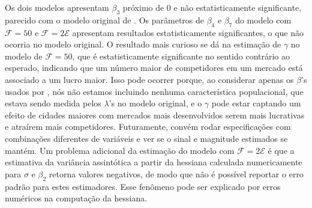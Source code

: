 \documentclass{article}
\begin{document}
Os dois modelos apresentam $\beta_3$ próximo de 0 e não estatisticamente significante, parecido com o modelo original de . Os parâmetros de $\beta_4$ e $\beta_7$ do modelo com $\mathcal{F}=50$ e $\mathcal{F}=2\mathcal{E}$ apresentam resultados estatisticamente significantes, o que não ocorria no modelo original. O resultado mais curioso se dá na estimação de $\gamma$ no modelo de $\mathcal{F}=50$, que é estatisticamente significante no sentido contrário ao esperado, indicando que um número maior de competidores em um mercado está associado a um lucro maior. Isso pode ocorrer porque, ao considerar apenas os $\beta$'s usados por , nós não estamos incluindo nenhuma característica populacional, que estava sendo medida pelos $\lambda$'s no modelo original, e o $\gamma$ pode estar captando um efeito de cidades maiores com mercados mais desenvolvidos serem mais lucrativas e atraírem mais competidores. Futuramente, convém rodar especificações com combinações diferentes de variáveis e ver se o sinal e magnitude estimados se mantém. Um problema adicional da estimação do modelo com $\mathcal{F}=2\mathcal{E}$ é que a estimativa da variância assintótica a partir da hessiana calculada numericamente para $\sigma$ e $\beta_2$ retorna valores negativos, de modo que não é possível reportar o erro padrão para estes estimadores. Esse fenômeno pode ser explicado por erros numéricos na computação da hessiana.



\end{document}
